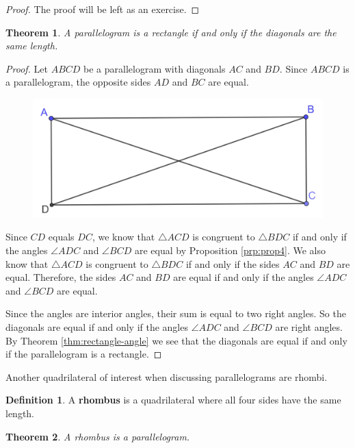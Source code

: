 \documentclass[
]{book}
\newtheorem{theorem}{Theorem}[chapter]
\theoremstyle{definition}
\newtheorem{definition}{Definition}[chapter]
\theoremstyle{definition}
\theoremstyle{definition}
\theoremstyle{definition}
\theoremstyle{remark}
\begin{document}
\begin{proof}
The proof will be left as an exercise.
\end{proof}

\begin{theorem}
A parallelogram is a rectangle if and only if the diagonals are the same length.
\end{theorem}

\begin{proof}
Let \(ABCD\) be a parallelogram with diagonals \(AC\) and \(BD\). Since \(ABCD\) is a parallelogram, the opposite sides \(AD\) and \(BC\) are equal.

\begin{figure}

{\centering \includegraphics[width=0.5\linewidth]{images/Rectangle-Diagonals} 

}

\end{figure}

Since \(CD\) equals \(DC\), we know that \(\triangle ACD\) is congruent to \(\triangle BDC\) if and only if the angles \(\angle ADC\) and \(\angle BCD\) are equal by Proposition \ref{prp:prop4}. We also know that \(\triangle ACD\) is congruent to \(\triangle BDC\) if and only if the sides \(AC\) and \(BD\) are equal. Therefore, the sides \(AC\) and \(BD\) are equal if and only if the angles \(\angle ADC\) and \(\angle BCD\) are equal.

Since the angles are interior angles, their sum is equal to two right angles. So the diagonals are equal if and only if the angles \(\angle ADC\) and \(\angle BCD\) are right angles. By Theorem \ref{thm:rectangle-angle} we see that the diagonals are equal if and only if the parallelogram is a rectangle.
\end{proof}

Another quadrilateral of interest when discussing parallelograms are rhombi.

\begin{definition}
A \textbf{rhombus} is a quadrilateral where all four sides have the same length.
\end{definition}

\begin{theorem}
A rhombus is a parallelogram.
\end{theorem}
\end{document}
